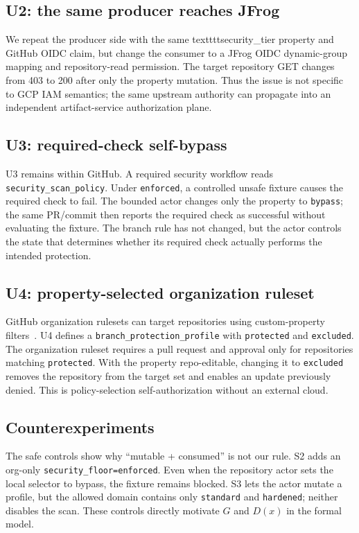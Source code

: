 \documentclass[sigconf,review,anonymous]{acmart}
\begin{document}
\subsection{U2: the same producer reaches JFrog}

We repeat the producer side with the same textttt{security\_tier} property and
GitHub OIDC claim, but change the consumer to a JFrog OIDC dynamic-group mapping
and repository-read permission.  The target repository GET changes from 403 to
200 after only the property mutation.  Thus the issue is not specific to GCP
IAM semantics; the same upstream authority can propagate into an independent
artifact-service authorization plane.

\subsection{U3: required-check self-bypass}

U3 remains within GitHub.  A required security workflow reads
\texttt{security\_scan\_policy}.  Under \texttt{enforced}, a controlled unsafe
fixture causes the required check to fail.  The bounded actor changes only the
property to \texttt{bypass}; the same PR/commit then reports the required check
as successful without evaluating the fixture.  The branch rule has not changed,
but the actor controls the state that determines whether its required check
actually performs the intended protection.

\subsection{U4: property-selected organization ruleset}

GitHub organization rulesets can target repositories using custom-property
filters~\cite{github-rulesets}.  U4 defines a
\texttt{branch\_protection\_profile} with \texttt{protected} and
\texttt{excluded}.  The organization ruleset requires a pull request and
approval only for repositories matching \texttt{protected}.  With the property
repo-editable, changing it to \texttt{excluded} removes the repository from the
target set and enables an update previously denied.  This is policy-selection
self-authorization without an external cloud.

\subsection{Counterexperiments}

The safe controls show why ``mutable + consumed'' is not our rule.  S2 adds an
org-only \texttt{security\_floor=enforced}.  Even when the repository actor sets
the local selector to bypass, the fixture remains blocked.  S3 lets the actor
mutate a profile, but the allowed domain contains only \texttt{standard} and
\texttt{hardened}; neither disables the scan.  These controls directly motivate
$G$ and $D(x)$ in the formal model.
\end{document}
